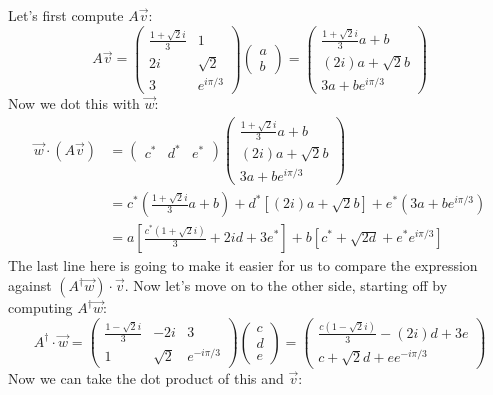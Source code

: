 \documentclass{article}
\begin{document}
\begin{solution}
	Let's first compute $A \vec v$: 
	\[
		A \vec v = \begin{pmatrix} \frac{1 + \sqrt{2}i}{3} & 1\\2i & \sqrt{2} \\3&e^{i \pi /3} \end{pmatrix} 
		\begin{pmatrix} a \\b  \end{pmatrix} = \begin{pmatrix} \frac{1 + \sqrt{2}i}{3}a + b\\ (2i)a + \sqrt{2} b\\3a +be^{i \pi /3} \end{pmatrix} 
	\] 
	Now we dot this with $\vec w$:
	\begin{align*}
		\vec w \cdot (A \vec v) &= \begin{pmatrix} c^*& d^* & e^* \end{pmatrix} \begin{pmatrix} 
	\frac{1 + \sqrt{2}i}{3}a + b\\ (2i)a + \sqrt{2} b\\3a + be^{i \pi /3} \end{pmatrix} \\
	&= c^*\left(\frac{1 + \sqrt{2} i}{3}a + b\right) +
	d^*\left[(2i)a + \sqrt{2}b\right] + e^*(3a + be^{i \pi /3}) \\
	&= a\left[\frac{c^*(1 + \sqrt{2}i)}{3} + 2id + 3e^*\right] + b\left[c^* + \sqrt{2d} + e^*e^{i \pi /3}\right]
	\end{align*}
	The last line here is going to make it easier for us to compare the expression against $(A^\dagger \vec w) \cdot \vec v$. Now let's move on to the other side, starting off by computing $A^\dagger \vec w$:
	\[
		A^\dagger \cdot \vec w = \begin{pmatrix} \frac{1 - \sqrt{2}i}{3} & -2i & 3\\1 & \sqrt{2} & e^{- i \pi /3} \end{pmatrix} \begin{pmatrix} c\\d\\e \end{pmatrix} = \begin{pmatrix} \frac{c(1 - \sqrt{2}i)}{3} - (2i)d + 3e\\
	c + \sqrt{2}d + e e^{- i \pi /3}\end{pmatrix} 
	\] 
	Now we can take the dot product of this and $\vec v$:
	\begin{align*}

\end{align*}
\end{solution}
\end{document}
